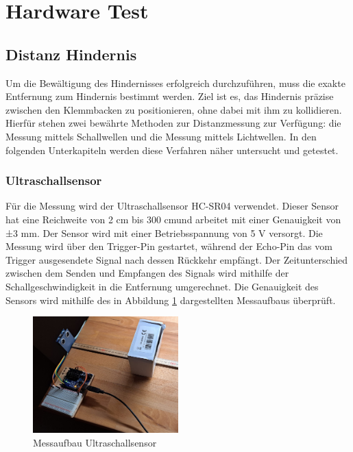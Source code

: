 \documentclass[../main.tex]{subfiles}
\begin{document}
\newpage
\section{Hardware Test}
\label{sec:Hardware_Test}
\subsection{Distanz Hindernis}
Um die Bewältigung des Hindernisses erfolgreich durchzuführen, muss die exakte Entfernung zum Hindernis bestimmt werden. Ziel ist es, das Hindernis präzise zwischen den Klemmbacken zu positionieren, ohne dabei mit ihm zu kollidieren. Hierfür stehen zwei bewährte Methoden zur Distanzmessung zur Verfügung: die Messung mittels Schallwellen und die Messung mittels Lichtwellen. In den folgenden Unterkapiteln werden diese Verfahren näher untersucht und getestet.
\subsubsection{Ultraschallsensor}
Für die Messung wird der Ultraschallsensor HC-SR04 verwendet. Dieser Sensor hat eine Reichweite von 2 cm bis 300 cm\footnotemark und arbeitet mit einer Genauigkeit von ±3 mm. Der Sensor wird mit einer Betriebsspannung von 5 V versorgt. Die Messung wird über den Trigger-Pin gestartet, während der Echo-Pin das vom Trigger ausgesendete Signal nach dessen Rückkehr empfängt. Der Zeitunterschied zwischen dem Senden und Empfangen des Signals wird mithilfe der Schallgeschwindigkeit in die Entfernung umgerechnet. Die Genauigkeit des Sensors wird mithilfe des in Abbildung \ref{fig:Ultraschall1} dargestellten Messaufbaus überprüft.

\begin{figure}[h] %
    \centering
    \includegraphics[width=0.5\textwidth]{img/sensortest/MA_Ultraschall.jpg} %
    \caption{Messaufbau Ultraschallsensor}
    \label{fig:Ultraschall1} %
\end{figure}
\end{document}
